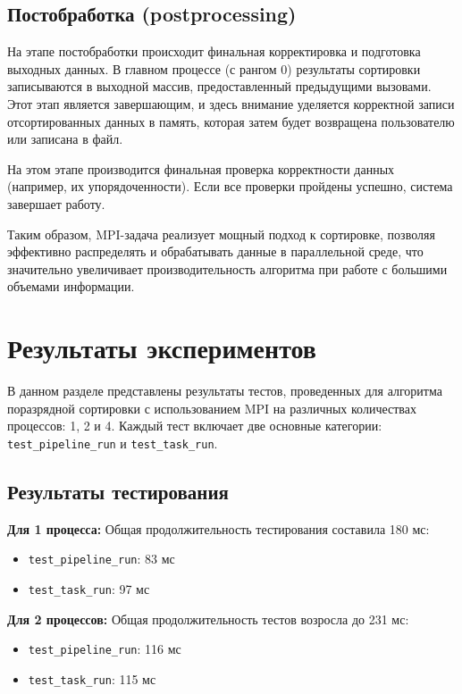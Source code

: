 \documentclass[12pt]{article}
\begin{document}
\subsection{Постобработка (postprocessing)}

На этапе постобработки происходит финальная корректировка и подготовка выходных данных. В главном процессе (с рангом 0) результаты сортировки записываются в выходной массив, предоставленный предыдущими вызовами. Этот этап является завершающим, и здесь внимание уделяется корректной записи отсортированных данных в память, которая затем будет возвращена пользователю или записана в файл.

На этом этапе производится финальная проверка корректности данных (например, их упорядоченности). Если все проверки пройдены успешно, система завершает работу.

Таким образом, MPI-задача реализует мощный подход к сортировке, позволяя эффективно распределять и обрабатывать данные в параллельной среде, что значительно увеличивает производительность алгоритма при работе с большими объемами информации.

\section{Результаты экспериментов}

В данном разделе представлены результаты тестов, проведенных для алгоритма поразрядной сортировки с использованием MPI на различных количествах процессов: 1, 2 и 4. Каждый тест включает две основные категории: \texttt{test\_pipeline\_run} и \texttt{test\_task\_run}. 

\subsection{Результаты тестирования}

\textbf{Для 1 процесса:}  
Общая продолжительность тестирования составила 180 мс:
\begin{itemize}
    \item \texttt{test\_pipeline\_run}: 83 мс
    \item \texttt{test\_task\_run}: 97 мс
\end{itemize}

\textbf{Для 2 процессов:}  
Общая продолжительность тестов возросла до 231 мс:
\begin{itemize}
    \item \texttt{test\_pipeline\_run}: 116 мс
    \item \texttt{test\_task\_run}: 115 мс
\end{itemize}
\end{document}
